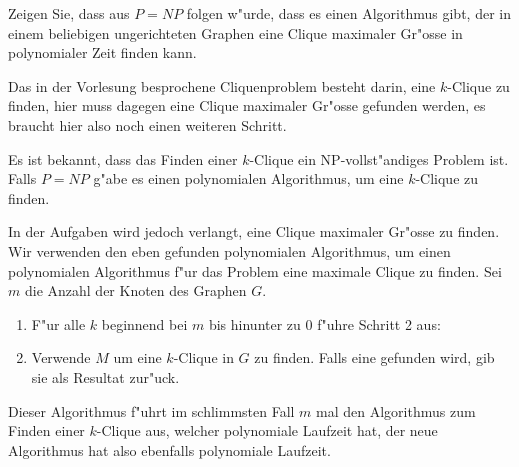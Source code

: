 Zeigen Sie, dass aus $P=NP$ folgen w"urde, dass es einen Algorithmus
gibt, der in einem beliebigen ungerichteten Graphen eine Clique
maximaler Gr"osse in polynomialer Zeit finden kann.

\begin{hinweis}
Das in der Vorlesung besprochene Cliquenproblem besteht
darin, eine $k$-Clique zu finden, hier muss dagegen eine Clique maximaler
Gr"osse gefunden werden, es braucht hier also noch einen weiteren
Schritt.
\end{hinweis}

\begin{loesung}
Es ist bekannt, dass das Finden einer $k$-Clique ein NP-vollst"andiges
Problem ist. Falls $P=NP$ g"abe es einen polynomialen Algorithmus, um
eine $k$-Clique zu finden.

In der Aufgaben wird jedoch verlangt, eine Clique maximaler
Gr"osse zu finden. Wir verwenden den eben gefunden polynomialen Algorithmus,
um einen polynomialen Algorithmus f"ur das Problem eine maximale Clique
zu finden.
Sei $m$ die Anzahl der Knoten des Graphen $G$.
\begin{enumerate}
\item F"ur alle $k$ beginnend bei $m$ bis hinunter zu $0$ f"uhre Schritt 2 aus:
\item Verwende $M$ um eine $k$-Clique in $G$ zu finden. Falls eine
gefunden wird, gib sie als Resultat zur"uck.
\end{enumerate}
Dieser Algorithmus f"uhrt im schlimmsten Fall $m$ mal den Algorithmus zum
Finden einer $k$-Clique aus, welcher polynomiale Laufzeit hat, der neue
Algorithmus hat also ebenfalls polynomiale Laufzeit.
\end{loesung}
